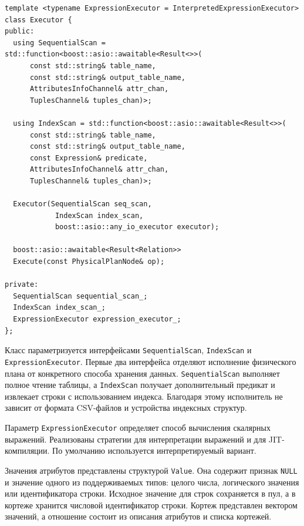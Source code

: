 \documentclass[fontsize=14pt, russian]{scrartcl}
\begin{document}
\begin{listing}[H]
  \caption{Основные элементы объявления класса Executor.}
  \label{lst:executor}
  \begin{verbatim}
template <typename ExpressionExecutor = InterpretedExpressionExecutor>
class Executor {
public:
  using SequentialScan = std::function<boost::asio::awaitable<Result<>>(
      const std::string& table_name,
      const std::string& output_table_name,
      AttributesInfoChannel& attr_chan,
      TuplesChannel& tuples_chan)>;

  using IndexScan = std::function<boost::asio::awaitable<Result<>>(
      const std::string& table_name,
      const std::string& output_table_name,
      const Expression& predicate,
      AttributesInfoChannel& attr_chan,
      TuplesChannel& tuples_chan)>;

  Executor(SequentialScan seq_scan,
            IndexScan index_scan,
            boost::asio::any_io_executor executor);

  boost::asio::awaitable<Result<Relation>>
  Execute(const PhysicalPlanNode& op);

private:
  SequentialScan sequential_scan_;
  IndexScan index_scan_;
  ExpressionExecutor expression_executor_;
};
  \end{verbatim}
\end{listing}

Класс параметризуется интерфейсами \verb|SequentialScan|, \verb|IndexScan| и
\verb|ExpressionExecutor|. Первые два интерфейса отделяют исполнение физического
плана от конкретного способа хранения данных. \verb|SequentialScan| выполняет
полное чтение таблицы, а \verb|IndexScan| получает дополнительный предикат и
извлекает строки с использованием индекса. Благодаря этому исполнитель не
зависит от формата CSV-файлов и устройства индексных структур.

Параметр \verb|ExpressionExecutor| определяет способ вычисления скалярных
выражений. Реализованы стратегии для интерпретации выражений и для
JIT-компиляции. По умолчанию используется интерпретируемый вариант.

Значения атрибутов представлены структурой \verb|Value|. Она содержит признак
\verb|NULL| и значение одного из поддерживаемых типов: целого числа, логического
значения или идентификатора строки. Исходное значение для строк сохраняется в
пул, а в кортеже хранится числовой идентификатор строки. Кортеж представлен
вектором значений, а отношение состоит из описания атрибутов и списка кортежей.
\end{document}
